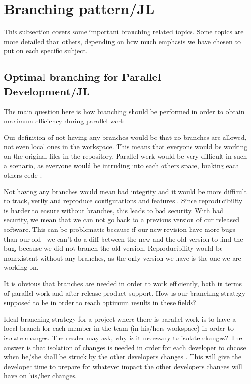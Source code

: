 \documentclass[10pt]{article}
\begin{document}
\section{Branching pattern/JL}
This subsection covers some important branching related topics. Some topics are more detailed than others, depending on how much emphasis we have chosen to put on each specific subject.

\subsection{Optimal branching for Parallel Development/JL}
The main question here is how branching should be performed in order to obtain maximum efficiency during parallel work.

\noindent Our definition of not having any branches would be that no branches are allowed, not even local ones in the workspace. This means that everyone would be working on the original files in the repository. Parallel work would be very difficult in such a scenario, as everyone would be intruding into each others space, braking each others code \cite{Appleton}.

\noindent Not having any branches would mean bad integrity and it would be more difficult to track, verify and reproduce configurations and features \cite{Appleton}. Since reproducibility is harder to ensure without branches, this leads to bad security. With bad security, we mean that we can not go back to a previous version of our released software. This can be problematic because if our new revision have more bugs than our old \cite{Babich}, we can't do a diff between the new and the old version to find the bug, because we did not branch the old version. Reproducibility would be nonexistent without any branches, as the only version we have is the one we are working on.

\noindent It is obvious that branches are needed in order to work efficiently, both in terms of parallel work and after release product support. How is our branching strategy supposed to be in order to reach optimum results in these fields?

\noindent Ideal branching strategy for a project where there is parallel work is to have a local branch for each member in the team (in his/hers workspace) in order to isolate changes. The reader may ask, why is it necessary to isolate changes? The answer is that isolation of changes is needed in order for each developer to choose when he/she shall be struck by the other developers changes \cite{Appleton}. This will give the developer time to prepare for whatever impact the other developers changes will have on his/her changes.
\end{document}
